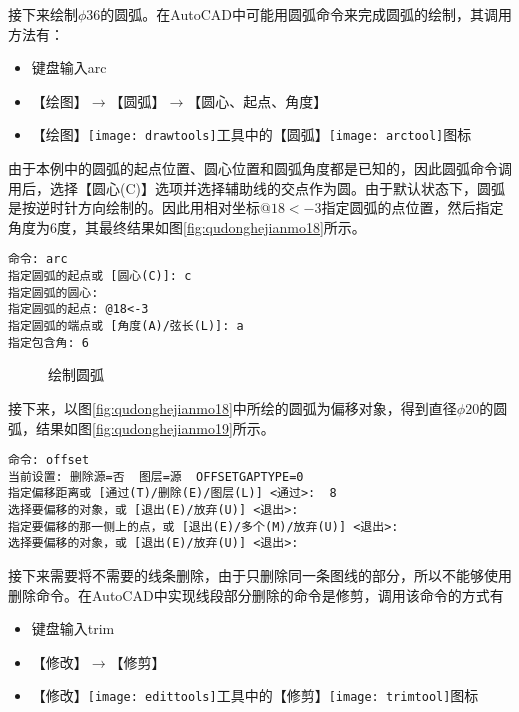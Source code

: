 \begin{procedure}
接下来绘制$\phi 36$的圆弧。在AutoCAD中可能用圆弧命令来完成圆弧的绘制，其调用方法有：
\begin{itemize}
	\item 键盘输入arc
	\item 【绘图】$\rightarrow$【圆弧】$\rightarrow$【圆心、起点、角度】
	\item 【绘图】\texttt{[image: drawtools]}工具中的【圆弧】\texttt{[image: arctool]}图标	
\end{itemize}

由于本例中的圆弧的起点位置、圆心位置和圆弧角度都是已知的，因此圆弧命令调用后，选择【圆心(C)】选项并选择辅助线的交点作为圆。由于默认状态下，圆弧是按逆时针方向绘制的。因此用相对坐标$ @18<-3$指定圆弧的点位置，然后指定角度为6度，其最终结果如图\ref{fig:qudonghejianmo18}所示。
\begin{lstlisting}
命令: arc
指定圆弧的起点或 [圆心(C)]: c
指定圆弧的圆心:
指定圆弧的起点: @18<-3
指定圆弧的端点或 [角度(A)/弦长(L)]: a
指定包含角: 6
\end{lstlisting}


\begin{figure}[htbp]
\centering
{}\hspace{60pt}
\caption{绘制圆弧}
\end{figure}

接下来，以图\ref{fig:qudonghejianmo18}中所绘的圆弧为偏移对象，得到直径$\phi 20$的圆弧，结果如图\ref{fig:qudonghejianmo19}所示。

\begin{lstlisting}
命令: offset
当前设置: 删除源=否  图层=源  OFFSETGAPTYPE=0
指定偏移距离或 [通过(T)/删除(E)/图层(L)] <通过>:  8
选择要偏移的对象，或 [退出(E)/放弃(U)] <退出>:
指定要偏移的那一侧上的点，或 [退出(E)/多个(M)/放弃(U)] <退出>:
选择要偏移的对象，或 [退出(E)/放弃(U)] <退出>:
\end{lstlisting}

接下来需要将不需要的线条删除，由于只删除同一条图线的部分，所以不能够使用删除命令。在AutoCAD中实现线段部分删除的命令是修剪，调用该命令的方式有
\begin{itemize}
	\item 键盘输入trim
	\item 【修改】$\rightarrow$【修剪】
	\item 【修改】\texttt{[image: edittools]}工具中的【修剪】\texttt{[image: trimtool]}图标	
\end{itemize}


\end{procedure}
